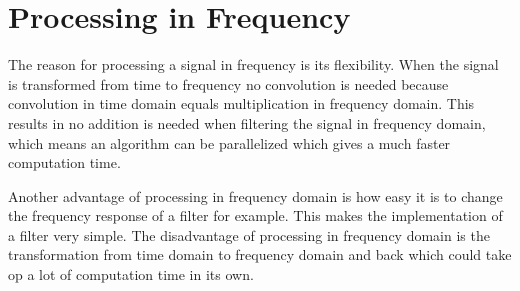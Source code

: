 \section{Processing in Frequency}
The reason for processing a signal in frequency is its flexibility. When the signal is transformed from time to frequency no convolution is needed because convolution in time domain equals multiplication in frequency domain. This results in no addition is needed when filtering the signal in frequency domain, which means an algorithm can be parallelized which gives a much faster computation time. 

Another advantage of processing in frequency domain is how easy it is to change the frequency response of a filter for example. This makes the implementation of a filter very simple. The disadvantage of processing in frequency domain is the transformation from time domain to frequency domain and back which could take op a lot of computation time in its own. 

